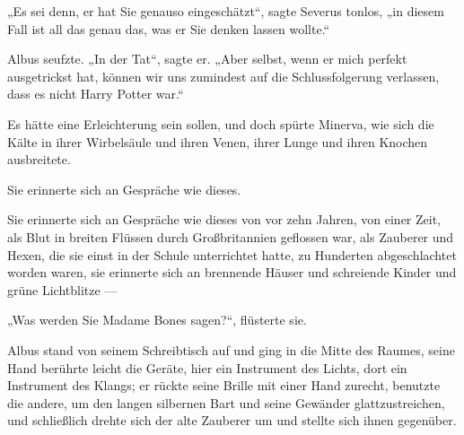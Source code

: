 „Es sei denn, er hat Sie genauso eingeschätzt“, sagte Severus tonlos, „in diesem Fall ist all das genau das, was er Sie denken lassen wollte.“

Albus seufzte.
„In der Tat“, sagte er.
„Aber selbst, wenn er mich perfekt ausgetrickst hat, können wir uns zumindest auf die Schlussfolgerung verlassen, dass es nicht Harry Potter war.“

Es hätte eine Erleichterung sein sollen, und doch spürte Minerva, wie sich die Kälte in ihrer Wirbelsäule und ihren Venen, ihrer Lunge und ihren Knochen ausbreitete.

Sie erinnerte sich an Gespräche wie dieses.

Sie erinnerte sich an Gespräche wie dieses von vor zehn Jahren, von einer Zeit, als Blut in breiten Flüssen durch Großbritannien geflossen war, als Zauberer und Hexen, die sie einst in der Schule unterrichtet hatte, zu Hunderten abgeschlachtet worden waren, sie erinnerte sich an brennende Häuser und schreiende Kinder und grüne Lichtblitze —

„Was werden Sie Madame Bones sagen?“, flüsterte sie.

Albus stand von seinem Schreibtisch auf und ging in die Mitte des Raumes, seine Hand berührte leicht die Geräte, hier ein Instrument des Lichts, dort ein Instrument des Klangs; er rückte seine Brille mit einer Hand zurecht, benutzte die andere, um den langen silbernen Bart und seine Gewänder glattzustreichen, und schließlich drehte sich der alte Zauberer um und stellte sich ihnen gegenüber.

